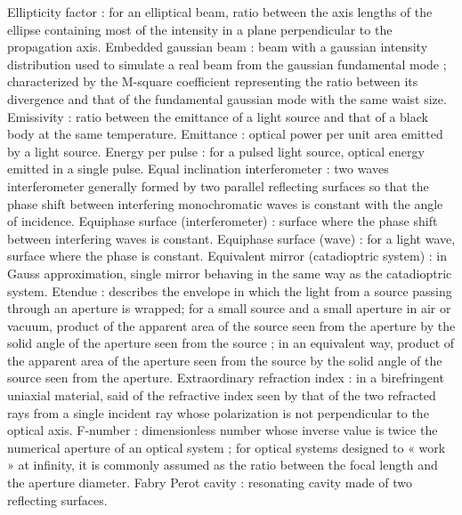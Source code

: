 Ellipticity factor                                   : for an elliptical beam, ratio between the axis lengths of the ellipse containing most of the intensity in a plane perpendicular to the propagation axis.
Embedded gaussian beam                               : beam with a gaussian intensity distribution used to simulate a real beam from the gaussian fundamental mode ; characterized by the M-square coefficient representing the ratio between its divergence and that of the fundamental gaussian mode with the same waist size.
Emissivity                                           : ratio between the emittance of a light source and that of a black body at the same temperature.
Emittance                                            : optical power per unit area emitted by a light source.
Energy per pulse                                     : for a pulsed light source, optical energy emitted in a single pulse.
Equal inclination interferometer                     : two waves interferometer generally formed by two parallel reflecting surfaces so that the phase shift between interfering monochromatic waves is constant with the angle of incidence.
Equiphase surface (interferometer)                   : surface where the phase shift between interfering waves is constant.
Equiphase surface (wave)                             : for a light wave, surface where the phase is constant.
Equivalent mirror (catadioptric system)              : in Gauss approximation, single mirror behaving in the same way as the catadioptric system.
Etendue                                              : describes the envelope in which the light from a source passing through an aperture is wrapped; for a small source and a small aperture in air or vacuum, product of the apparent area of the source seen from the aperture by the solid angle of the aperture seen from the source ; in an equivalent way, product of the apparent area of the aperture seen from the source by the solid angle of the source seen from the aperture.
Extraordinary refraction index                       : in a birefringent uniaxial material, said of the refractive index seen by that of the two refracted rays from a single incident ray whose polarization is not perpendicular to the optical axis.
F-number                                             : dimensionless number whose inverse value is twice the numerical aperture of an optical system ; for optical systems designed to « work » at infinity, it is commonly assumed as the ratio between the focal length and the aperture diameter.
Fabry Perot cavity                                   : resonating cavity made of two reflecting surfaces.
